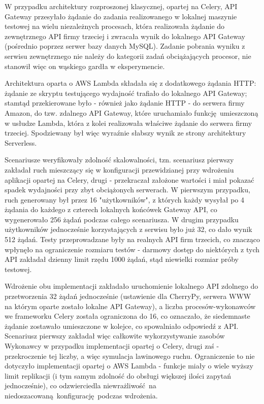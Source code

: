 \documentclass[oneside]{mgr}
\begin{document}
W przypadku architektury rozproszonej klasycznej, opartej na Celery, API Gateway przesyłało żądanie do zadania realizowanego w lokalnej maszynie testowej na wielu niezależnych procesach, która realizowała żądanie do zewnętrznego API firmy trzeciej i zwracała wynik do lokalnego API Gateway (pośrednio poprzez serwer bazy danych MySQL). Zadanie pobrania wyniku z serwisu zewnętrznego nie należy do kategorii zadań obciążających procesor, nie stanowił więc on wąskiego gardła w eksperymencie.

Architektura oparta o AWS Lambda składała się z dodatkowego żądania HTTP: żądanie ze skryptu testującego wydajność trafiało do lokalnego API Gateway; stamtąd przekierowane było - również jako żądanie HTTP - do serwera firmy Amazon, do tzw. zdalnego API Gateway, które uruchamiało funkcję umieszczoną w usłudze Lambda, która z kolei realizowała właściwe żądanie do serwera firmy trzeciej. Spodziewany był więc wyraźnie słabszy wynik ze strony architektury Serverless.

Scenariusze weryfikowały zdolność skalowalności, tzn. scenariusz pierwszy zakładał ruch mieszczący się w konfiguracji przewidzianej przy wdrożeniu aplikacji opartej na Celery, drugi - przekraczał założone wartości i miał pokazać spadek wydajności przy zbyt obciążonych serwerach. W pierwszym przypadku, ruch generowany był przez 16 "użytkowników", z których każdy wysyłał po 4 żądania do każdego z czterech lokalnych końcówek Gateway API, co wygenerowało 256 żądań podczas całego scenariusza. W drugim przypadku użytkowników jednocześnie korzystających z serwisu było już 32, co dało wynik 512 żądań. Testy przeprowadzane były na realnych API firm trzecich, co znacząco wpłynęło na ograniczenie rozmiaru testów - darmowy dostęp do niektórych z tych API zakładał dzienny limit rzędu 1000 żądań, stąd niewielki rozmiar próby testowej.

Wdrożenie obu implementacji zakładało uruchomienie lokalnego API zdolnego do przetworzenia 32 żądań jednocześnie (ustawienie dla CherryPy, serwera WWW na którym oparte zostało lokalne API Gateway), a liczba procesów-wykonawców we frameworku Celery została ograniczona do 16, co oznaczało, że siedemnaste żądanie zostawało umieszczone w kolejce, co spowalniało odpowiedź z API. Scenariusz pierwszy zakładał więc całkowite wykorzystywanie zasobów Wykonawcy w przypadku implementacji opartej o Celery, drugi zaś - przekroczenie tej liczby, a więc symulacja lawinowego ruchu. Ograniczenie to nie dotyczyło implementacji opartej o AWS Lambda - funkcje miały o wiele wyższy limit replikacji (i tym samym zdolność do obsługi większej ilości zapytań jednocześnie), co odzwierciedla niewrażliwość na niedoszacowaną konfigurację podczas wdrożenia.
\end{document}
